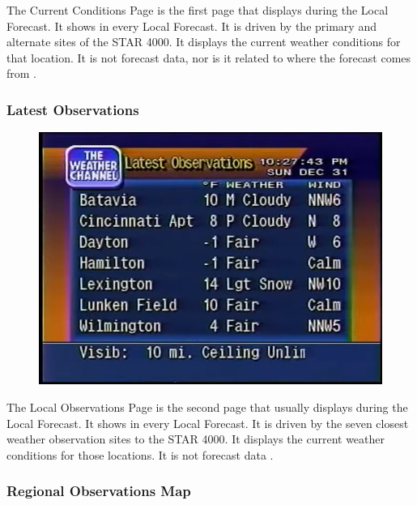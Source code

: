 \documentclass[a4paper,11pt]{refart}
\begin{document}
The Current Conditions Page is the first page that displays during the Local Forecast. It shows in every Local Forecast. It is driven by the primary and alternate sites of the STAR 4000. It displays the current weather conditions for that location. It is not forecast data, nor is it related to where the forecast comes from \cite{WS4KProdGde}.

\subsubsection*{Latest Observations}

\begin{figure}[ht!]\centering
\includegraphics[width=\textwidth]{img/latest-observ.png}
\end{figure}


The Local Observations Page is the second page that usually displays during the Local Forecast. It shows in every Local Forecast. It is driven by the seven closest weather observation sites to the STAR 4000. It displays the current weather conditions for those locations. It is not forecast data \cite{WS4KProdGde}.

\subsubsection*{Regional Observations Map}
\end{document}

